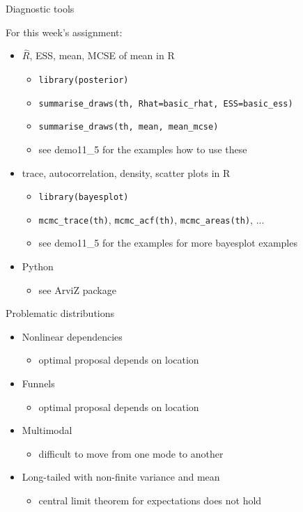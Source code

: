 \documentclass[finnish,english,t]{beamer}
\begin{document}
\begin{frame}{Diagnostic tools}

  For this week's assignment:
  \begin{itemize}
  \item<+-> $\widehat{R}$, ESS, mean, MCSE of mean in R
    \begin{itemize}
    \item \texttt{library(posterior)}
    \item \texttt{summarise\_draws(th, Rhat=basic\_rhat, ESS=basic\_ess)}
    \item \texttt{summarise\_draws(th, mean, mean\_mcse)}
    \item see demo11\_5 for the examples how to use these
    \end{itemize}
  \item<+-> trace, autocorrelation, density, scatter plots in R
    \begin{itemize}
    \item \texttt{library(bayesplot)}
    \item \texttt{mcmc\_trace(th)}, \texttt{mcmc\_acf(th)}, \texttt{mcmc\_areas(th)}, ...
    \item see demo11\_5 for the examples for more bayesplot examples
    \end{itemize}
  \item<+-> Python
    \begin{itemize}
    \item see ArviZ package
    \end{itemize}
  \end{itemize}
  
\end{frame}

\begin{frame}{Problematic distributions}

  \begin{itemize}
  \item<1-> Nonlinear dependencies
    \begin{itemize}
    \item optimal proposal depends on location
    \end{itemize}
  \item<2-> Funnels
    \begin{itemize}
    \item optimal proposal depends on location
    \end{itemize}
  \item<3-> Multimodal
    \begin{itemize}
    \item difficult to move from one mode to another
    \end{itemize}
  \item<4-> Long-tailed with non-finite variance and mean
    \begin{itemize}
    \item central limit theorem for expectations does not hold
    \end{itemize}
  \end{itemize}

\end{frame}
\end{document}

